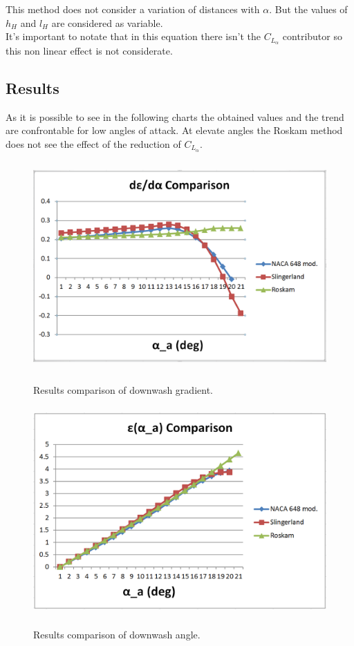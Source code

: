 This method does not consider a variation of distances with $\alpha$. But the values of $h_H$ and $l_H$ are considered as variable. \\
It's important to notate that in this equation there isn't the $C_{L_{\alpha}}$ contributor so this non linear effect is not considerate. 

\subsection{Results}

As it is possible to see in the following charts the obtained values and the trend are confrontable for low angles of attack. At elevate angles the Roskam method does not see the effect of the reduction of $C_{L_{\alpha}}$.

\begin{figure}[H]
\centering
{\includegraphics[height=8cm]{immagini/downwashcomparison1}} 
\caption{Results comparison of downwash gradient.}
\label{comparisondownwash}
\end{figure} 

\begin{figure}[H]
\centering
{\includegraphics[height=8cm]{immagini/downwashcomparison2}} 
\caption{Results comparison of downwash angle.}
\label{comparisondownwash2}
\end{figure} 

